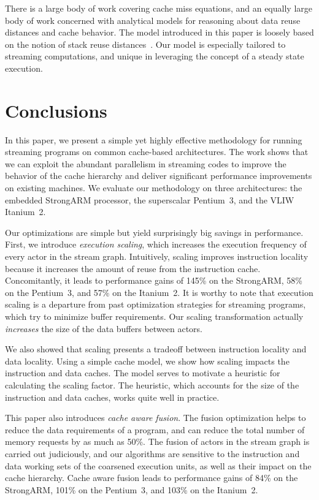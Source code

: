 \documentclass{sigplanconf}
\begin{document}
There is a large body of work covering cache miss equations, and an
equally large body of work concerned with analytical models for
reasoning about data reuse distances and cache behavior. 
The model introduced in this paper is loosely based on the notion of
stack reuse distances~\cite{mattson70}.  Our model is especially tailored 
to streaming computations, and unique
in leveraging the concept of a steady state execution.

\section{Conclusions}
\label{sec:conclusion}

In this paper, we present a simple yet highly effective methodology
for running streaming programs on common cache-based architectures.
The work shows that we can exploit the abundant parallelism in
streaming codes to improve the behavior of the cache hierarchy and
deliver significant performance improvements on existing machines. We
evaluate our methodology on three architectures: the embedded
StrongARM processor, the superscalar Pentium~3, and the VLIW Itanium~2.

Our optimizations are simple but yield surprisingly big savings in
performance. First, we introduce {\it execution scaling}, which 
increases the execution frequency of every actor in the stream
graph. Intuitively, scaling improves instruction  locality because
it increases the amount of reuse from the instruction
cache. Concomitantly, it leads to performance gains of 145\% on the
StrongARM, 58\% on the Pentium~3, and 57\% on the Itanium~2.
It is worthy to note that execution scaling is a departure from
past optimization strategies for streaming programs, which try to
minimize buffer requirements. Our scaling transformation actually {\it
increases} the size of the data buffers between actors.

We also showed that scaling presents a tradeoff between 
instruction locality and data locality. Using a simple cache
model, we show how scaling impacts the instruction and data
caches. The model serves to motivate a heuristic for calculating the
scaling factor. The heuristic, which accounts for the size of the
instruction and data caches, works quite well in practice.

This paper also introduces {\it cache aware fusion}. The fusion
optimization helps to reduce the data requirements of a program, and
can reduce the total number of memory requests by as much as 50\%. The
fusion of actors in the stream graph is carried out judiciously, and
our algorithms are sensitive to the instruction and data working sets
of the coarsened execution units, as well as their impact on the cache
hierarchy. Cache aware fusion leads to performance gains of 84\% on
the StrongARM, 101\% on the Pentium~3, and 103\% on the Itanium~2.
\end{document}
